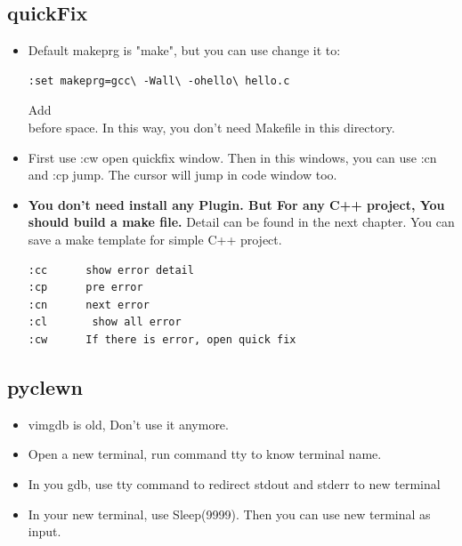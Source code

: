 \documentclass[a4paper,12pt,twoside]{book}
\begin{document}
\subsection{quickFix}
\begin{itemize}
\item Default makeprg is "make", but you can use change it to:
\begin{verbatim}
:set makeprg=gcc\ -Wall\ -ohello\ hello.c 
\end{verbatim}
Add \\ before space. In this way, you don't need Makefile in this directory.
\item First use :cw open quickfix window. Then in this windows, you can use :cn and :cp jump. The cursor will jump in code window  too. 
\item \textbf{You don't need install any Plugin. But For any C++ project, You should build a make file.} Detail can be found in the next chapter.  You can save a make template for simple C++ project. 
\begin{verbatim}
:cc      show error detail
:cp      pre error 
:cn      next error 
:cl       show all error
:cw      If there is error, open quick fix 
\end{verbatim}
\end{itemize}

\subsection{pyclewn}
\begin{itemize}
\item vimgdb is old, Don't use it anymore.
\item Open a new terminal, run command tty to know terminal name.
\item In you gdb, use tty command to redirect stdout and stderr to new terminal
\item In your new terminal, use Sleep(9999). Then you can use new terminal as input. 
\end{itemize}
\end{document}
